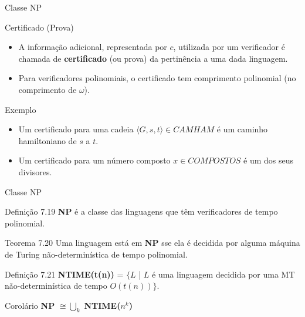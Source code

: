 \documentclass[xcolor=dvipsnames,table]{beamer}
\begin{document}
	\begin{frame}{Classe NP}
		\begin{block}{Certificado (Prova)}
			\begin{itemize}
				\item A informação adicional, representada por $c$, utilizada por um verificador é chamada de {\bf certificado} (ou prova) da pertinência a uma dada linguagem. 
				\item Para verificadores polinomiais, o certificado tem comprimento polinomial (no comprimento de $\omega$).
			\end{itemize}
		\end{block} 
		\begin{block}{Exemplo}
			\begin{itemize}
				\item Um certificado para uma cadeia $\langle G, s, t \rangle \in CAMHAM$ é um caminho hamiltoniano de $s$ a $t$. 
				\item Um certificado para um número composto $x \in COMPOSTOS $ é um dos seus divisores.
			\end{itemize}
		\end{block}
	\end{frame}
	
	\begin{frame}[shrink]{Classe NP}
		\begin{block}{Definição 7.19}
			{\bf NP} é a classe das linguagens que têm verificadores de tempo polinomial.
		\end{block}
		\begin{block}{Teorema 7.20}
			Uma linguagem está em {\bf NP} sse ela é decidida por alguma máquina de Turing não-determinística de tempo polinomial.
		\end{block} 
		\begin{block}{Definição 7.21}
			{\bf NTIME(t(n))} = $\{L$ | $L$ é uma linguagem decidida por uma MT não-determinística de tempo $O(t(n)) \}$.
		\end{block}
		\begin{exampleblock}{Corolário}
			{\bf NP} $ \cong \bigcup_k$ {\bf NTIME($n^k$)}
		\end{exampleblock}
	\end{frame}
	
\end{document}

